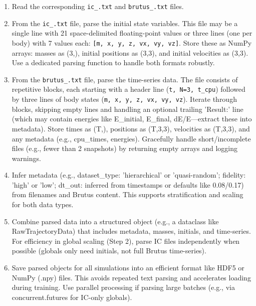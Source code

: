 \documentclass{article}
\begin{document}
\begin{enumerate}
    \item Read the corresponding \texttt{ic\_.txt} and \texttt{brutus\_.txt} files.
    
    \item From the \texttt{ic\_.txt} file, parse the initial state variables. This file may be a single line with 21 space-delimited 
    floating-point values or three lines (one per body) with 7 values each: \texttt{[m, x, y, z, vx, vy, vz]}. Store these as NumPy arrays: 
    masses as (3,), initial positions as (3,3), and initial velocities as (3,3). Use a dedicated parsing function to handle both formats robustly.
    
    
    \item From the \texttt{brutus\_.txt} file, parse the time-series data. The file consists of repetitive blocks, each starting with a header line 
    (\texttt{t, N=3, t\_cpu}) followed by three lines of body states (\texttt{m, x, y, z, vx, vy, vz}). 
    Iterate through blocks, skipping empty lines and handling an optional trailing 'Result:' line 
    (which may contain energies like E\_initial, E\_final, dE/E—extract these into metadata). Store times as (T,), positions as (T,3,3), 
    velocities as (T,3,3), and any metadata (e.g., cpu\_times, energies). 
    Gracefully handle short/incomplete files (e.g., fewer than 2 snapshots) by returning empty arrays and logging warnings.


    \item Infer metadata (e.g., dataset\_type: 'hierarchical' or 'quasi-random'; fidelity: 'high' or 'low'; dt\_out: inferred from timestamps or 
    defaults like 0.08/0.17) from filenames and Brutus content. This supports stratification and scaling for both data types.


    \item Combine parsed data into a structured object (e.g., a dataclass like RawTrajectoryData) that includes metadata, masses, 
    initials, and time-series. For efficiency in global scaling (Step 2), parse IC files independently when possible (globals only need initials, 
    not full Brutus time-series).



    \item Save parsed objects for all simulations into an efficient format like HDF5 or NumPy (.npy) files. 
    This avoids repeated text parsing and accelerates loading during training. Use parallel processing if parsing large batches 
    (e.g., via concurrent.futures for IC-only globals).
\end{enumerate}
    
\end{document}

